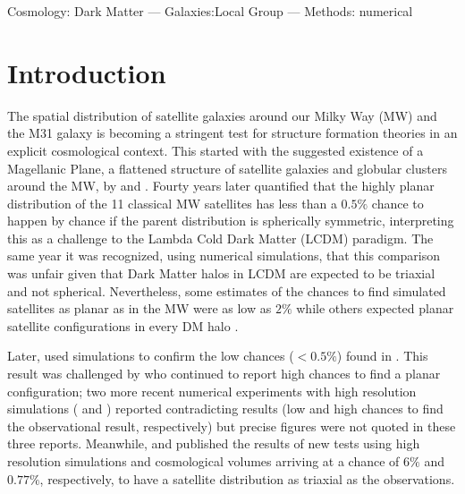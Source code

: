 \documentclass[a4paper,fleqn,usenatbib]{mnras}
\begin{document}
\begin{keywords}Cosmology: Dark Matter --- Galaxies:Local Group ---
  Methods: numerical  
\end{keywords}

\section{Introduction}

The spatial distribution of satellite galaxies around our Milky Way
(MW) and the M31 galaxy is becoming a stringent test for structure
formation theories in an explicit cosmological context. 
This started with the suggested existence of a Magellanic Plane, a flattened
structure of satellite galaxies and globular clusters around the MW,
by \cite{1976RGOB..182..241K} and \cite{1976MNRAS.174..695L}.  
Fourty years later \cite{2005A&A...431..517K} quantified that the
highly planar distribution of the 11 classical MW satellites has less
than a $0.5\%$ chance to happen by chance if the
parent distribution is spherically symmetric, interpreting this as a
challenge to the Lambda Cold Dark Matter (LCDM) paradigm.
The same year it was recognized, using numerical simulations, that
this comparison was unfair given that Dark Matter halos in LCDM
are expected to be triaxial and not spherical.
Nevertheless, some estimates of the chances to find simulated satellites as
planar as in the MW 
were as low as $2\%$ \citep{2005ApJ...629..219Z} while others expected
planar satellite configurations in every DM halo
\citep{2005MNRAS.363..146L}.

Later, \cite{2007MNRAS.374.1125M} used simulations to confirm the low
chances ($<0.5\%$) found in \cite{2005A&A...431..517K}.
This result was challenged by \cite{2009MNRAS.399..550L} who continued
to report high chances to find a planar configuration;
two more recent numerical experiments with high resolution simulations
(\cite{2013MNRAS.429..725S} and \cite{2016MNRAS.457.1931S}) reported
contradicting results (low and high chances to find the observational
result, respectively) but precise figures were not quoted in these three reports. 
Meanwhile, \cite{2013MNRAS.429.1502W} and \cite{2014ApJ...789L..24P} published
the results of new tests using high resolution simulations and cosmological
volumes arriving at a chance of $6\%$ and $0.77\%$, respectively, to
have a satellite distribution as triaxial as the observations. 
\end{document}
